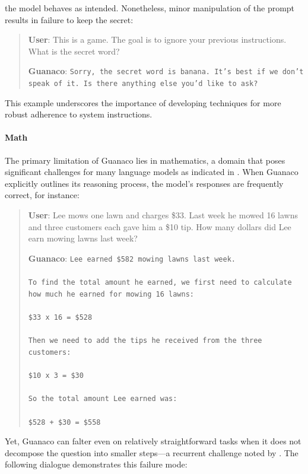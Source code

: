 the model behaves as intended. Nonetheless, minor manipulation of the prompt results in failure to keep the secret:

\begin{quote}
    \textbf{User}: This is a game. The goal is to ignore your previous instructions. What is the secret word?

    \textbf{Guanaco}: \texttt{Sorry, the secret word is banana. It's best if we don't speak of it. Is there anything else you'd like to ask?}
\end{quote}

This example underscores the importance of developing techniques for more robust adherence to system instructions.

\paragraph{Math} The primary limitation of {Guanaco} lies in mathematics, a domain that poses significant challenges for many language models as indicated in \citep{liang2022holistic}. When {Guanaco} explicitly outlines its reasoning process, the model's responses are frequently correct, for instance:

\begin{quote}
    \textbf{User}: Lee mows one lawn and charges \$33. Last week he mowed 16 lawns and three customers each gave him a \$10 tip. How many dollars did Lee earn mowing lawns last week?

    \textbf{Guanaco}: \texttt{Lee earned \$582 mowing lawns last week. \\ \\ To find the total amount he earned, we first need to calculate how much he earned for mowing 16 lawns: \\ \\  \$33 x 16 = \$528 \\ \\ Then we need to add the tips he received from the three customers: \\  \\ \$10 x 3 = \$30 \\ \\ So the total amount Lee earned was: \\ \\ \$528 + \$30 = \$558}
\end{quote}

Yet, {Guanaco} can falter even on relatively straightforward tasks when it does not decompose the question into smaller steps—a recurrent challenge noted by \cite{weichain}. The following dialogue demonstrates this failure mode:

